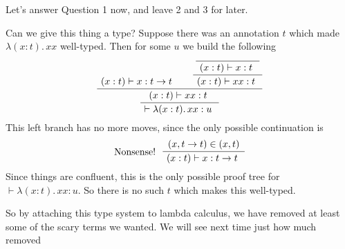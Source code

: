 \documentclass[12pt]{article}
\newenvironment{bprooftree}
  {\leavevmode\hbox\bgroup}
  {\DisplayProof\egroup}
\begin{document}
\noindent Let's answer Question 1 now, and leave 2 and 3 for later.

Can we give this thing a type? Suppose there was an annotation $t$ which made $\lambda (x:t).\,xx$ well-typed.
Then for some $u$ we build the following
\[
\begin{bprooftree}
\AxiomC{$ (x:t) \vdash x : t \rightarrow t$ }
  \AxiomC{}
  \UnaryInfC{$ (x:t) \vdash x : t$ }
  \UnaryInfC{$ (x:t) \vdash xx : t$ }
\BinaryInfC{$ (x:t) \vdash xx : t$ }
\UnaryInfC{$ \vdash \lambda (x:t).\,xx : u$ }
\end{bprooftree}
\]
This left branch has no more moves, since the only possible continuation is
\[
\begin{bprooftree}
\AxiomC{$ (x,t \rightarrow t) \in (x,t)$}
\LeftLabel{Nonsense!  }
\UnaryInfC{$ (x:t) \vdash x : t \rightarrow t$ }
\end{bprooftree}
\]
Since things are confluent, this is the only possible proof tree for $\vdash \lambda (x:t).\,xx : u$.
So there is no such $t$ which makes this well-typed.

So by attaching this type system to lambda calculus, we have removed at least some of the scary terms we wanted.
We will see next time just how much removed
\end{document}
